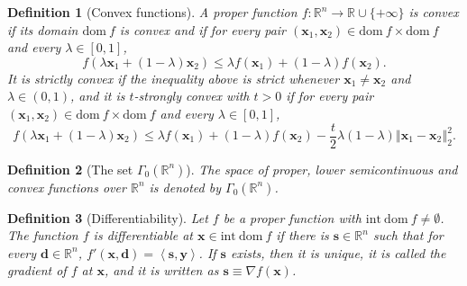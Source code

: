 \documentclass[11pt]{article}
\numberwithin{prop}{section}
\numberwithin{lem}{section}
\numberwithin{rem}{section}
\numberwithin{cor}{section}
\numberwithin{thm}{section}
\newtheorem{defn}{Definition}
\numberwithin{defn}{section}
\numberwithin{fact}{section}
\theoremstyle{plain}
\def\bd {\boldsymbol{d}}
\def\bs {\boldsymbol{s}}
\def\bx {\boldsymbol{x}}
\def\by {\boldsymbol{y}}
\def\R {\mathbb{R}}
\newcommand{\normsq}[1]{\left\Vert{#1} \right\Vert_{2}^{2}}
\def\dom {\mathrm{dom~}}    %
\def\interior {\mathrm{int }}  %
\def\Rn {\R^n}
\def\gmRn {\Gamma_0(\Rn)}   %
\begin{document}
%
\begin{defn}[Convex functions] \label{def:convex} 
A proper function $f\colon\Rn\to\R\cup\{+\infty\}$ is convex if its domain $\dom f$ is convex and if for every pair $(\bx_{1},\bx_{2}) \in \dom f \times \dom f$ and every $\lambda\in[0,1]$,
\[
f(\lambda\bx_{1}+(1-\lambda)\bx_{2})\leqslant\lambda f(\bx_{1})+(1-\lambda)f(\bx_{2}).
\]
It is \textit{strictly convex} if the inequality above is strict whenever $\bx_{1}\neq\bx_{2}$ and $\lambda \in (0,1)$, and it is \textit{$t$-strongly convex} with $t>0$ if for every pair $(\bx_{1},\bx_{2}) \in \dom f \times \dom f$ and every $\lambda\in[0,1]$, 
\[
f(\lambda\bx_{1}+(1-\lambda)\bx_{2})\leqslant\lambda f(\bx_{1})+(1-\lambda)f(\bx_{2})-\frac{t}{2}\lambda(1-\lambda)\normsq{\bx_{1}-\bx_{2}}.
\]
\end{defn}
%
\begin{defn}[The set $\gmRn$]\label{def:gmrn}
The space of proper, lower semicontinuous and convex functions over $\Rn$ is denoted by $\gmRn$.
\end{defn}
%
\begin{defn}[Differentiability] \label{def:differentiability}
Let $f$ be a proper function with $\interior{~\dom f} \neq \emptyset$. The function $f$ is differentiable at $\bx \in \interior{~\dom f}$ if there is $\bs \in \Rn$ such that for every $\bd \in \Rn$, $f'(\bx,\bd) = \left\langle \bs,\by\right\rangle$. If $\bs$ exists, then it is unique, it is called the gradient of $f$ at $\bx$, and it is written as $\bs \equiv \nabla f(\bx)$.
\end{defn}
%
\end{document}
